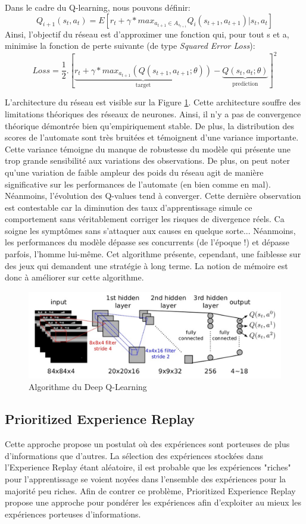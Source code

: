 \noindent Dans le cadre du Q-learning, nous pouvons définir: $$Q_{i+1}(s_t,a_t)=E[r_t+\gamma*max_{a_{t+1}\in A_{s_{t+1}}}Q_i(s_{t+1},a_{t+1})|s_t,a_t]$$
Ainsi, l'objectif du réseau est d'approximer une fonction qui, pour tout s et a, minimise la fonction de perte suivante (de type \textit{Squared Error Loss}):
$$Loss=\frac{1}{2}.[\underbrace{r_t+\gamma* max_{a_{t+1}}(Q(s_{t+1},a_{t+1};\theta))}_\text{target}-\underbrace{Q(s_t,a_t;\theta)}_\text{prediction}]^2$$

\noindent L'architecture du réseau est visible sur la Figure \ref{deepql}. Cette architecture souffre des limitations théoriques des réseaux de neurones. Ainsi, il n'y a pas de convergence théorique démontrée bien qu'empiriquement stable. De plus, la distribution des scores de l'automate sont très bruitées et témoignent d'une variance importante. Cette variance témoigne du manque de robustesse du modèle qui présente une trop grande sensibilité aux variations des observations. De plus, on peut noter qu'une variation de faible ampleur des poids du réseau agit de manière significative sur les performances de l'automate (en bien comme en mal). Néanmoins, l'évolution des Q-values tend à converger. Cette dernière observation est contestable car la diminution des taux d'apprentissage simule ce comportement sans véritablement corriger les risques de divergence réels. Ca soigne les symptômes sans s'attaquer aux causes en quelque sorte... Néanmoins, les performances du modèle dépasse ses concurrents (de l'époque !) et dépasse parfois, l'homme lui-même. Cet algorithme présente, cependant, une faiblesse sur des jeux qui demandent une stratégie à long terme. La notion de mémoire est donc à améliorer sur cette algorithme.

\begin{figure}
    \centering
    \includegraphics[scale=0.2]{./tex/reinforcement-learning/deepql.png}
    \caption{Algorithme du Deep Q-Learning}
    \label{deepql}
\end{figure}

\subsection{Prioritized Experience Replay}
Cette approche propose un postulat où des expériences sont porteuses de plus d'informations que d'autres. La sélection des expériences stockées dans l'Experience Replay étant aléatoire, il est probable que les expériences "riches" pour l'apprentissage se voient noyées dans l'ensemble des expériences pour la majorité peu riches. Afin de contrer ce problème, Prioritized Experience Replay\cite{priorexprep} propose une approche pour pondérer les expériences afin d'exploiter au mieux les expériences porteuses d'informations.\\

